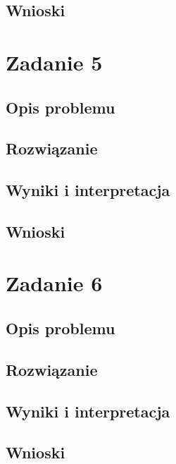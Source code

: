 \documentclass[a4paper]{article}
\begin{document}
    \subsection{Wnioski}
\section{Zadanie 5}
    \subsection{Opis problemu}
    \subsection{Rozwiązanie}
    \subsection{Wyniki i interpretacja}
    \subsection{Wnioski}
\section{Zadanie 6}
    \subsection{Opis problemu}
    \subsection{Rozwiązanie}
    \subsection{Wyniki i interpretacja}
    \subsection{Wnioski}
\end{document}

